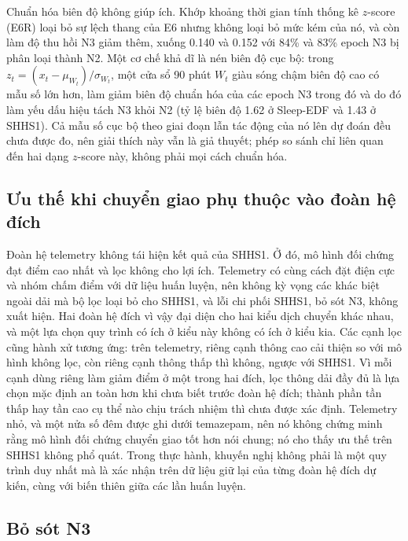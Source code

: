 \documentclass[11pt,a4paper]{article}
\begin{document}
Chuẩn hóa biên độ không giúp ích. Khớp khoảng thời gian tính thống kê $z$-score (E6R) loại bỏ sự lệch thang của
E6 nhưng không loại bỏ mức kém của nó, và còn làm độ thu hồi N3 giảm thêm, xuống 0.140 và 0.152 với 84\% và 83\%
epoch N3 bị phân loại thành N2. Một cơ chế khả dĩ là nén biên độ cục bộ: trong
$z_t=(x_t-\mu_{W_t})/\sigma_{W_t}$, một cửa sổ 90 phút $W_t$ giàu sóng chậm biên độ cao có mẫu số lớn hơn, làm
giảm biên độ chuẩn hóa của các epoch N3 trong đó và do đó làm yếu dấu hiệu tách N3 khỏi N2 (tỷ lệ biên độ 1.62 ở
Sleep-EDF và 1.43 ở SHHS1). Cả mẫu số cục bộ theo giai đoạn lẫn tác động của nó lên dự đoán đều chưa được đo, nên
giải thích này vẫn là giả thuyết; phép so sánh chỉ liên quan đến hai dạng $z$-score này, không phải mọi cách chuẩn
hóa.

\subsection{Ưu thế khi chuyển giao phụ thuộc vào đoàn hệ đích}

Đoàn hệ telemetry không tái hiện kết quả của SHHS1. Ở đó, mô hình đối chứng đạt điểm cao nhất và lọc không cho
lợi ích. Telemetry có cùng cách đặt điện cực và nhóm chấm điểm với dữ liệu huấn luyện, nên không kỳ vọng các
khác biệt ngoài dải mà bộ lọc loại bỏ cho SHHS1, và lỗi chi phối SHHS1, bỏ sót N3, không xuất hiện. Hai đoàn hệ
đích vì vậy đại diện cho hai kiểu dịch chuyển khác nhau, và một lựa chọn quy trình có ích ở kiểu này không có ích
ở kiểu kia. Các cạnh lọc cũng hành xử tương ứng: trên telemetry, riêng cạnh thông cao cải thiện so với mô hình
không lọc, còn riêng cạnh thông thấp thì không, ngược với SHHS1. Vì mỗi cạnh dùng riêng làm giảm điểm ở một trong
hai đích, lọc thông dải đầy đủ là lựa chọn mặc định an toàn hơn khi chưa biết trước đoàn hệ đích; thành phần tần
thấp hay tần cao cụ thể nào chịu trách nhiệm thì chưa được xác định. Telemetry nhỏ, và một nửa số đêm được ghi
dưới temazepam, nên nó không chứng minh rằng mô hình đối chứng chuyển giao tốt hơn nói chung; nó cho thấy ưu thế
trên SHHS1 không phổ quát. Trong thực hành, khuyến nghị không phải là một quy trình duy nhất mà là xác nhận trên
dữ liệu giữ lại của từng đoàn hệ đích dự kiến, cùng với biến thiên giữa các lần huấn luyện.

\subsection{Bỏ sót N3}
\end{document}

